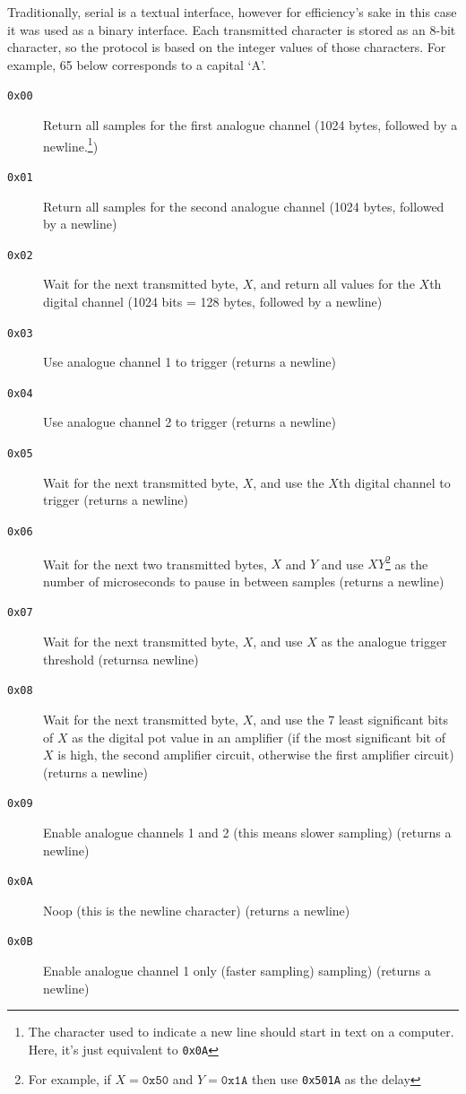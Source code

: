 Traditionally, serial is a textual interface, however for efficiency's sake in
this case it was used as a binary interface. Each transmitted character is
stored as an 8-bit character, so the protocol is based on the integer values of
those characters. For example, 65 below corresponds to a capital `A'.

\begin{description}

  \item[\texttt{0x00}] Return all samples for the first analogue channel (1024
  bytes, followed by a newline.\footnote{The character used to indicate a new
  line should start in text on a computer. Here, it's just equivalent to
  \texttt{0x0A}})

  \item[\texttt{0x01}] Return all samples for the second analogue channel (1024
  bytes, followed by a newline)

  \item[\texttt{0x02}] Wait for the next transmitted byte, $X$, and return all
  values for the $X$th digital channel (1024 bits = 128 bytes, followed by a
  newline)

  \item[\texttt{0x03}] Use analogue channel 1 to trigger (returns a newline)

  \item[\texttt{0x04}] Use analogue channel 2 to trigger (returns a newline)

  \item[\texttt{0x05}] Wait for the next transmitted byte, $X$, and use the
  $X$th digital channel to trigger (returns a newline)

  \item[\texttt{0x06}] Wait for the next two transmitted bytes, $X$ and $Y$ and
  use $XY$\footnote{For example, if $X = \texttt{0x50}$ and $Y=\texttt{0x1A}$
  then use \texttt{0x501A} as the delay} as the number of microseconds to pause
  in between samples (returns a newline)

  \item[\texttt{0x07}] Wait for the next transmitted byte, $X$, and use $X$ as
  the analogue trigger threshold (returnsa  newline)

  \item[\texttt{0x08}] Wait for the next transmitted byte, $X$, and use the 7
  least significant bits of $X$ as the digital pot value in an amplifier (if the
  most significant bit of $X$ is high, the second amplifier circuit, otherwise
  the first amplifier circuit) (returns a newline)

  \item[\texttt{0x09}] Enable analogue channels 1 and 2 (this means slower
  sampling) (returns a newline)

  \item[\texttt{0x0A}] Noop (this is the newline character) (returns a newline)

  \item[\texttt{0x0B}] Enable analogue channel 1 only (faster sampling)
  sampling) (returns a newline)

\end{description}


